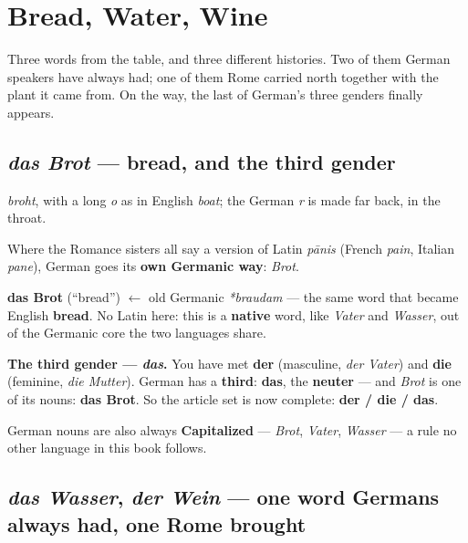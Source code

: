 \chapter{Bread, Water, Wine}
\label{ch:food}

Three words from the table, and three different histories. Two of them German
speakers have always had; one of them Rome carried north together with the
plant it came from. On the way, the last of German's three genders finally
appears.

\section{\emph{das Brot} --- bread, and the third gender}
\label{lesson:brot}

\begin{sounds}
\emph{broht}, with a long \emph{o} as in English \emph{boat}; the German
\emph{r} is made far back, in the throat.
\end{sounds}

Where the Romance sisters all say a version of Latin \emph{p\=anis} (French
\emph{pain}, Italian \emph{pane}), German goes its \textbf{own Germanic way}:
\emph{Brot}.

\begin{cousinweb}
\textbf{das Brot} (``bread'') $\leftarrow$ old Germanic \emph{*braudam} --- the
same word that became English \textbf{bread}. No Latin here: this is a
\textbf{native} word, like \emph{Vater} and \emph{Wasser}, out of the Germanic
core the two languages share.
\end{cousinweb}

\begin{grammarlens}
\textbf{The third gender --- \emph{das}.} You have met \textbf{der}
(masculine, \emph{der Vater}) and \textbf{die} (feminine, \emph{die Mutter}).
German has a \textbf{third}: \textbf{das}, the \textbf{neuter} --- and
\emph{Brot} is one of its nouns: \textbf{das Brot}. So the article set is now
complete: \textbf{der / die / das}.
\end{grammarlens}

\begin{culture}
German nouns are also always \textbf{Capitalized} --- \emph{Brot},
\emph{Vater}, \emph{Wasser} --- a rule no other language in this book follows.
\end{culture}

\section[\emph{Wasser} and \emph{Wein}]{\emph{das Wasser}, \emph{der Wein} --- one word Germans always had, one Rome brought}
\label{lesson:wasser-wein}

